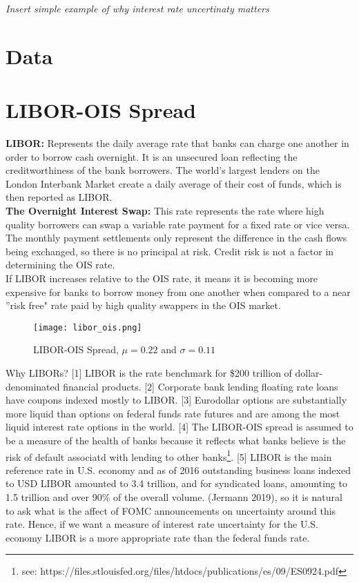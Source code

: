 \documentclass[11pt]{article}
\begin{document}
\textit{Insert simple example of why interest rate uncertinaty matters}
\section{Data}

\section{LIBOR-OIS Spread}
\textbf{LIBOR:} Represents the daily average rate that banks can charge one another in order to borrow cash overnight. It is an unsecured loan reflecting the creditworthiness of the bank borrowers. The world's largest lenders on the London Interbank Market create a daily average of their cost of funds, which is then reported as LIBOR. \\

\noindent \textbf{The Overnight Interest Swap:} This rate represents the rate where high quality borrowers can swap a variable rate payment for a fixed rate or vice versa. The monthly payment settlements only represent the difference in the cash flows being exchanged, so there is no principal at risk. Credit risk is not a factor in determining the OIS rate. \\

If LIBOR increases relative to the OIS rate, it means it is becoming more expensive for banks to borrow money from one another when compared to a near ''risk free" rate paid by high quality swappers in the OIS market.


\begin{figure}
	\centering
	\texttt{[image: libor\_ois.png]}
	\caption{LIBOR-OIS Spread, $\mu = 0.22$ and $\sigma = 0.11$}
	\label{fig:libor_ois_spread}
\end{figure}
Why LIBORs? [1] LIBOR is the rate benchmark for \$200 trillion of dollar-denominated financial products. [2] Corporate bank lending floating rate loans have coupons indexed mostly to LIBOR. [3] Eurodollar options are substantially more liquid than options on federal funds rate futures and are among the most liquid interest rate options in the world. [4] The LIBOR-OIS spread is assumed to be a measure of the health of banks because it reflects what banks believe is the risk of default associatd with lending to other banks\footnote{see: https://files.stlouisfed.org/files/htdocs/publications/es/09/ES0924.pdf}.
[5] LIBOR is the main reference rate in U.S. economy and as of 2016 outstanding business loans indexed to USD LIBOR amounted to 3.4 trillion, and for syndicated loans, amounting to 1.5 trillion and over 90\% of the overall volume.  (Jermann 2019), so it is natural to ask what is the affect of FOMC announcements on uncertainty around this rate. Hence, if we want a measure of interest rate uncertainty for the U.S. economy LIBOR is a more appropriate rate than the federal funds rate.  \\
\end{document}
